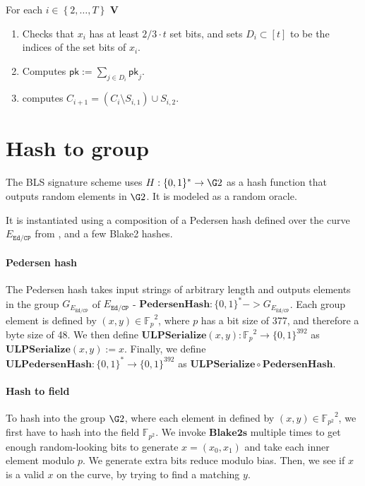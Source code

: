 \documentclass[11pt]{article}
\numberwithin{figure}{section} %
\newcommand{\set}[1]{\ensuremath{\left\{#1\right\}}\xspace}
\newcommand{\Fp}{\ensuremath{\mathbb{F}_p}\xspace}
\newcommand{\Fptwo}{\ensuremath{\mathbb{F}_{p^2}}\xspace}
\newcommand{\defeq}{:=}
\newcommand{\msg}{\ensuremath{\mathsf{m}}\xspace}
\newcommand{\pk}{\ensuremath{\mathsf{pk}}\xspace}
\newcommand{\phash}{\ensuremath{\mathbf{PedersenHash}}\xspace}
\newcommand{\ulphash}{\ensuremath{\mathbf{ULPedersenHash}}\xspace}
\newcommand{\bhash}{\ensuremath{\mathbf{Blake2s}}\xspace}
\newcommand{\ulpserialize}{\ensuremath{\mathbf{ULPSerialize}}\xspace}
\newcommand{\ver}{\ensuremath{\mathsf{\mathbf{V}}}\xspace}
\newcommand{\sig}{\ensuremath{\sigma}\xspace}
\newcommand{\edcp}{\ensuremath{{E}_\mathtt{Ed/CP}}\xspace}
\newcommand{\gedcp}{\ensuremath{G_{{E}_\mathtt{Ed/CP}}}\xspace}
\begin{document}
For each $i\in \set{2,\ldots,T}$ \ver 
\begin{enumerate}
 \item Checks that $x_i$ has at least $2/3\cdot t$ set bits, and sets $D_i\subset [t]$ to be the indices of the set bits of $x_i$.
 \item Computes $\pk\defeq \sum_{j\in D_i} \pk_j$.
 \item computes $C_{i+1} = (C_{i}\setminus S_{i,1})\cup S_{i,2}$.
 
\end{enumerate}

\section{Hash to group}

The BLS signature scheme uses $H: \{0,1\}^* \rightarrow \G2$ as a hash function that outputs random elements in $\G2$. It is modeled as a random oracle.

It is instantiated using a composition of a Pedersen hash defined over the curve $\edcp$ from \cite{bowe2018zexe}, and a few Blake2 hashes. 

\paragraph{Pedersen hash}
The Pedersen hash takes input strings of arbitrary length and outputs elements in the group $\gedcp$ of $\edcp$ - $\phash: \{0,1\}^* -> \gedcp$. Each group element is defined by $(x,y) \in \Fp^2$, where $p$ has a bit size of 377, and therefore a byte size of 48. We then define $\ulpserialize(x,y): \Fp^2 \rightarrow \{0,1\}^{392}$ as $\ulpserialize(x,y) := x$. Finally, we define $\ulphash: \{0,1\}^* \rightarrow \{0,1\}^{392}$ as $\ulpserialize \circ \phash $.

\paragraph{Hash to field}
To hash into the group $\G2$, where each element in defined by $(x,y) \in \Fptwo^2$, we first have to hash into the field $\Fptwo$. We invoke $\bhash$ multiple times to get enough random-looking bits to generate $x = (x_0, x_1)$ and take each inner element modulo $p$. We generate extra bits reduce modulo bias. Then, we see if $x$ is a valid $x$ on the curve, by trying to find a matching $y$.
\end{document}
